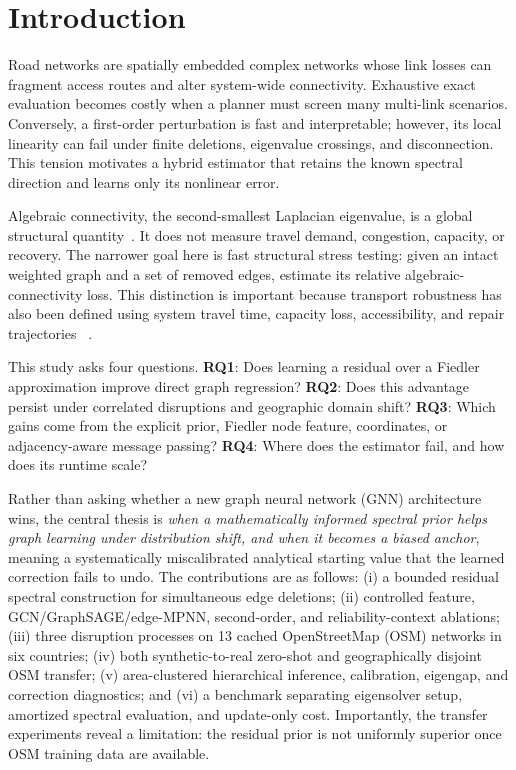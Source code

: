 \documentclass[11pt]{article}
\begin{document}
\section{Introduction}
Road networks are spatially embedded complex networks whose link losses can
fragment access routes and alter system-wide connectivity. Exhaustive exact
evaluation becomes costly when a planner must screen many multi-link scenarios.
Conversely, a first-order perturbation is fast and interpretable; however, its local
linearity can fail under finite deletions, eigenvalue crossings, and
disconnection. This tension motivates a hybrid estimator that retains the known
spectral direction and learns only its nonlinear error.

Algebraic connectivity, the second-smallest Laplacian eigenvalue, is a global
structural quantity~\cite{fiedler1973,mohar1991}. It does not measure travel
demand, congestion, capacity, or recovery. The narrower goal here is fast
structural stress testing: given an intact weighted graph and a set of removed
edges, estimate its relative algebraic-connectivity loss. This distinction is
important because transport robustness has also been defined using system travel
time, capacity loss, accessibility, and repair trajectories
~\cite{scott2006,sullivan2010,sohouenou2021repair}.

This study asks four questions. \textbf{RQ1}: Does learning a residual over a
Fiedler approximation improve direct graph regression? \textbf{RQ2}: Does this
advantage persist under correlated disruptions and geographic domain shift?
\textbf{RQ3}: Which gains come from the explicit prior, Fiedler node feature,
coordinates, or adjacency-aware message passing? \textbf{RQ4}: Where does the
estimator fail, and how does its runtime scale?

Rather than asking whether a new graph neural network (GNN) architecture wins, the central thesis is
\emph{when a mathematically informed spectral prior helps graph learning under
distribution shift, and when it becomes a biased anchor}, meaning a systematically
miscalibrated analytical starting value that the learned correction fails to undo. The contributions
are as follows: (i) a bounded residual spectral construction for simultaneous edge
deletions; (ii) controlled feature, GCN/GraphSAGE/edge-MPNN, second-order, and reliability-context
ablations; (iii) three disruption processes on 13 cached OpenStreetMap (OSM) networks in six countries; (iv) both
synthetic-to-real zero-shot and geographically disjoint OSM transfer; (v)
area-clustered hierarchical inference, calibration, eigengap, and correction diagnostics; and
(vi) a benchmark separating eigensolver setup, amortized spectral evaluation,
and update-only cost. Importantly, the transfer experiments reveal a limitation:
the residual prior is not uniformly superior once OSM training data are
available.
\end{document}
